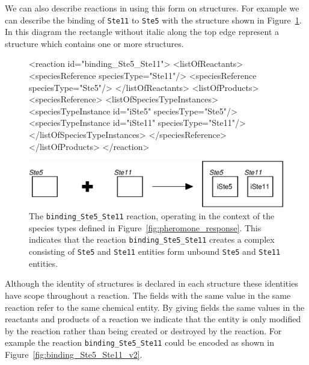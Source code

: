 \documentclass{cekarticle}
\begin{document}
We can also describe reactions in using this form on
 structures.  For example we can describe
the binding of \texttt{Ste11} to \texttt{Ste5} with the
 structure shown in
Figure~\ref{fig:binding_Ste5_Ste11}. In this diagram the rectangle
without italic along the top edge represent a
 structure which contains one or
more  structures.

\begin{figure}[h]
\begin{example}
<reaction id="binding_Ste5_Ste11">
    <listOfReactants>
        <speciesReference speciesType="Ste11"/>
        <speciesReference speciesType="Ste5"/>
    </listOfReactants>
    <listOfProducts>
        <speciesReference>
            <listOfSpeciesTypeInstances>
                <speciesTypeInstance id="iSte5" speciesType="Ste5"/>
                <speciesTypeInstance id="iSte11" speciesType="Ste11"/>
            </listOfSpeciesTypeInstances>
        </speciesReference>
    </listOfProducts>
</reaction>
\end{example}
  \vspace*{8pt}
  \centering
  \includegraphics[scale = 0.7]{binding_Ste5_Ste11.eps}
  \caption{The \texttt{binding\_Ste5\_Ste11} reaction, operating in the context of the species types
  defined in Figure~\ref{fig:pheromone_response}.  This indicates that the reaction
  \texttt{binding\_Ste5\_Ste11} creates a complex consisting of \texttt{Ste5} and \texttt{Ste11} entities
  form unbound \texttt{Ste5} and \texttt{Ste11} entities.}
  \label{fig:binding_Ste5_Ste11}
\end{figure}

Although the identity of  structures is
declared in each  structure these
identities have scope throughout a reaction. The
  fields with the same value
in the same reaction refer to the same chemical entity.  By giving
  fields the same values in
the reactants and products of a reaction we indicate that the
entity is only modified by the reaction rather than being created
or destroyed by the reaction.  For example the reaction
\texttt{binding\_Ste5\_Ste11} could be encoded as shown in
Figure~\ref{fig:binding_Ste5_Ste11_v2}.
\end{document}
